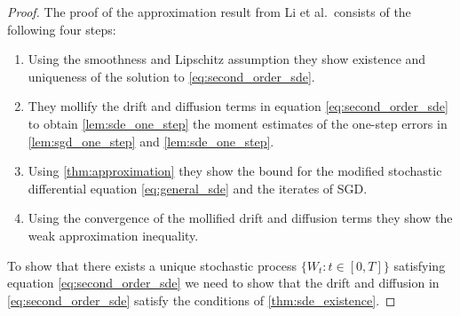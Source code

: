 \documentclass[12pt]{article}
\theoremstyle{definition}
\numberwithin{equation}{section}
\begin{document}
\begin{proof}
  The proof of the approximation result from Li et al.\ consists of the following four steps:
  \begin{enumerate}
    \item Using the smoothness and Lipschitz assumption they show existence and uniqueness of the solution to \eqref{eq:second_order_sde}.
    \item They mollify the drift and diffusion terms in equation \eqref{eq:second_order_sde} to obtain \autoref{lem:sde_one_step} the moment estimates of the one-step errors in \autoref{lem:sgd_one_step} and \autoref{lem:sde_one_step}.
    \item Using \autoref{thm:approximation} they show the bound for the modified stochastic differential equation \eqref{eq:general_sde} and the iterates of SGD.
    \item Using the convergence of the mollified drift and diffusion terms they show the weak approximation inequality.
  \end{enumerate}
  To show that there exists a unique stochastic process $\{W_t: t \in [0,T]\}$ satisfying equation \eqref{eq:second_order_sde} we need to show that the drift and diffusion in \eqref{eq:second_order_sde} satisfy the conditions of \autoref{thm:sde_existence}.


\end{proof}
\end{document}
